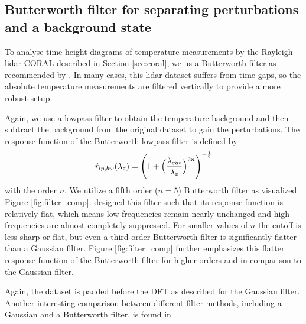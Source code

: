 \subsection*{Butterworth filter for separating perturbations and a background state}
To analyse time-height diagrams of temperature measurements by the Rayleigh lidar CORAL described in Section \ref{sec:coral}, we us a Butterworth filter as recommended by \textcite[]{ehard_evaluation_2015}. In many cases, this lidar dataset suffers from time gaps, so the absolute temperature measurements are filtered vertically to provide a more robust setup.

Again, we use a lowpass filter to obtain the temperature background and then subtract the background from the original dataset to gain the perturbations. The response function of the Butterworth lowpass filter is defined by 
\begin{equation}
    \hat{r}_{lp,bw}(\lambda_z) = \Biggl(1+\Bigl(\frac{\lambda_{cut}}{\lambda_{z}}\Bigr)^{2n}\Biggr)^{-\frac{1}{2}}
    \label{equ:butterworth_filter}
\end{equation}
with the order $n$. We utilize a fifth order ($n=5$) Butterworth filter as visualized Figure \ref{fig:filter_comp}. \textcite{butterworth_theory_1930} designed this filter such that its response function is relatively flat, which means low frequencies remain nearly unchanged and high frequencies are almost completely suppressed. For smaller values of $n$ the cutoff is less sharp or flat, but even a third order Butterworth filter is significantly flatter than a Gaussian filter. Figure \ref{fig:filter_comp} further emphasizes this flatter response function of the Butterworth filter for higher orders and in comparison to the Gaussian filter.

Again, the dataset is padded before the DFT as described for the Gaussian filter. Another interesting comparison between different filter methods, including a Gaussian and a Butterworth filter, is found in \textcite{krisch_superposition_2020}.

%

